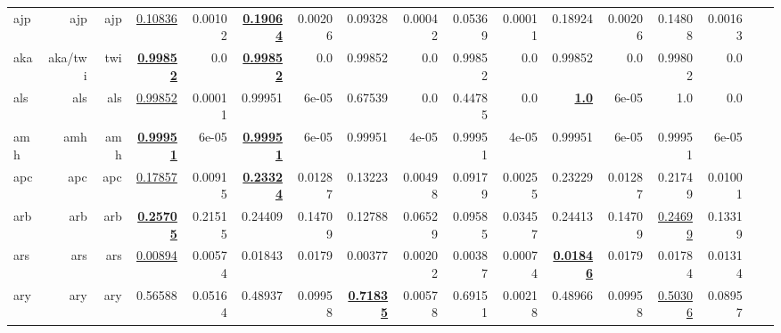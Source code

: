 \documentclass[11pt]{article}
\begin{document}
\begin{table*}[h]
{\begin{tabular}{lrrrrrrrrrrrrrrrr}
ajp         & ajp         & ajp         & \underline{0.10836}         & 0.00102         & \textbf{\underline{0.19064}}         & 0.00206         & 0.09328         & 0.00042         & 0.05369         & 0.00011         & 0.18924         & 0.00206         & 0.14808         & 0.00163         \\
aka         & aka/twi         & twi         & \textbf{\underline{0.99852}}         & 0.0         & \textbf{\underline{0.99852}}         & 0.0         & 0.99852         & 0.0         & 0.99852         & 0.0         & 0.99852         & 0.0         & 0.99802         & 0.0         \\
als         & als         & als         & \underline{0.99852}         & 0.00011         & 0.99951         & 6e-05         & 0.67539         & 0.0         & 0.44785         & 0.0         & \textbf{\underline{1.0}}         & 6e-05         & 1.0         & 0.0         \\
amh         & amh         & amh         & \textbf{\underline{0.99951}}         & 6e-05         & \textbf{\underline{0.99951}}         & 6e-05         & 0.99951         & 4e-05         & 0.99951         & 4e-05         & 0.99951         & 6e-05         & 0.99951         & 6e-05         \\
apc         & apc         & apc         & \underline{0.17857}         & 0.00915         & \textbf{\underline{0.23324}}         & 0.01287         & 0.13223         & 0.00498         & 0.09179         & 0.00255         & 0.23229         & 0.01287         & 0.21749         & 0.01001         \\
arb         & arb         & arb         & \textbf{\underline{0.25705}}         & 0.21515         & 0.24409         & 0.14709         & 0.12788         & 0.06529         & 0.09585         & 0.03457         & 0.24413         & 0.14709         & \underline{0.24699}         & 0.13319         \\
ars         & ars         & ars         & \underline{0.00894}         & 0.00574         & 0.01843         & 0.0179         & 0.00377         & 0.00202         & 0.00387         & 0.00074         & \textbf{\underline{0.01846}}         & 0.0179         & 0.01784         & 0.01314         \\
ary         & ary         & ary         & 0.56588         & 0.05164         & 0.48937         & 0.09958         & \textbf{\underline{0.71835}}         & 0.00578         & 0.69151         & 0.00218         & 0.48966         & 0.09958         & \underline{0.50306}         & 0.08957         \\

\end{tabular}}
\end{table*}
\end{document}
